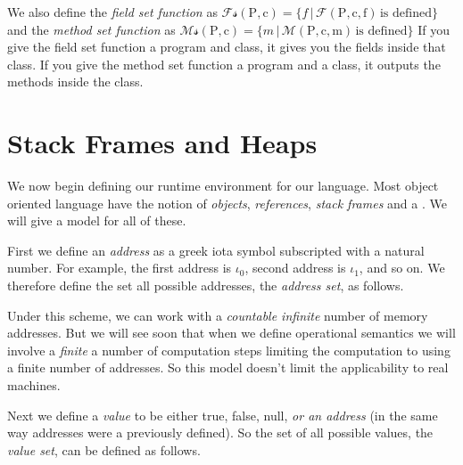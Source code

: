 
We also define the \textit{field set function} as 
$\mathcal{Fs}(\text{P},\text{c}) = \{ f\, |\, 
\mathcal{F}(\text{P},\text{c}, \text{f})\, \text{is defined} \}$
and the \textit{method set function} as
$\mathcal{Ms}(\text{P},\text{c}) = \{ m\, |\, 
\mathcal{M}(\text{P},\text{c}, \text{m})\, \text{is defined} \}$
If you give the field set function a program and class, it gives 
you the fields inside that class. If you give the method set 
function a program and a class, it outputs the methods inside the class. 

\section{Stack Frames and Heaps}

We now begin defining our runtime environment for our language. 
Most object oriented language have the notion of \textit{objects}, 
\textit{references}, \textit{stack frames} and a . 
We will give a model for all of these.

First we define an \textit{address} as a greek 
iota symbol subscripted with a natural number. 
For example, the first address is $\iota_0$, second address is $\iota_1$, and so on.
We therefore define the set all possible addresses, the \textit{address set}, as follows.


Under this scheme, we can work with a \textit{countable infinite} 
number of memory addresses. 
But we will see soon that when we define operational semantics
we will involve a \textit{finite} a number of computation 
steps limiting the computation to using a finite number of addresses. 
So this model doesn't limit the applicability to real machines.

Next we define a \textit{value} to be either true, false, null, \textit{or 
an address} (in the same way addresses were a previously defined). 
So the set of all possible values, 
the \textit{value set}, can be defined as follows.


